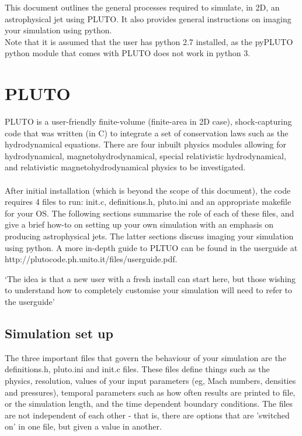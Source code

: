 \documentclass[12pt]{article}
\begin{document}
\maketitle

\noindent This document outlines the general processes required to simulate, in 2D, an astrophysical jet using PLUTO. It also provides general instructions on imaging your simulation using python. \\
\newline
Note that it is assumed that the user has python 2.7 installed, as the pyPLUTO python module that comes with PLUTO does not work in python 3.
\section{PLUTO}

PLUTO is a user-friendly finite-volume (finite-area in 2D case), shock-capturing code that was written (in C) to integrate a set of conservation laws such as the hydrodynamical equations. There are four inbuilt physics modules allowing for hydrodynamical, magnetohydrodynamical, special relativistic hydrodynamical, and relativistic magnetohydrodynamical physics to be investigated.\\
\\
After initial installation (which is beyond the scope of this document), the code requires 4 files to run: init.c, definitions.h, pluto.ini and an appropriate makefile for your OS. The following sections summarise the role of each of these files, and give a brief how-to on setting up your own simulation with an emphasis on producing astrophysical jets. The latter sections discuss imaging your simulation using python. A more in-depth guide to PLTUO can be found in the userguide at http://plutocode.ph.unito.it/files/userguide.pdf.

`The idea is that a new user with a fresh install can start here, but those wishing to understand how to completely customise your simulation will need to refer to the userguide' 
\subsection{Simulation set up}

The three important files that govern the behaviour of your simulation are the definitions.h, pluto.ini and init.c files. These files define things such as the physics, resolution, values of your input parameters (eg, Mach numbers, densities and pressures), temporal parameters such as how often results are printed to file, or the simulation length, and the time dependent boundary conditions. The files are not independent of each other - that is, there are options that are 'switched on' in one file, but given a value in another.
\end{document}
